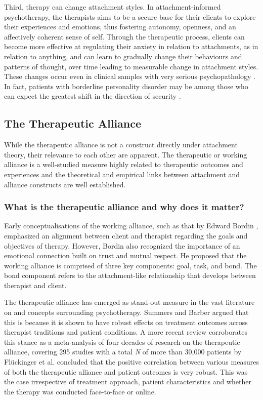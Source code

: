 \documentclass[12pt]{report}
\begin{document}
Third, therapy can change attachment styles. In attachment-informed psychotherapy, the therapists aims to be a secure base for their clients to explore their experiences and emotions, thus fostering autonomy, openness, and an affectively coherent sense of self.
Through the therapeutic process, clients can become more effective at regulating their anxiety in relation to attachments, as in relation to anything, and can learn to gradually change their behaviours and patterns of thought, over time leading to measurable change in attachment styles.
These changes occur even in clinical samples with very serious psychopathology \cite{Fonagy1996}.
In fact, patients with borderline personality disorder may be among those who can expect the greatest shift in the direction of security \cite{Levy2006, Stovall2003}.

\subsection{The Therapeutic Alliance}
While the therapeutic alliance is not a construct directly under attachment theory, their relevance to each other are apparent. The therapeutic or working alliance is a well-studied measure highly related to therapeutic outcomes and experiences and the theoretical and empirical links between attachment and alliance constructs are well established.

\subsubsection*{What is the therapeutic alliance and why does it matter?}
Early conceptualisations of the working alliance, such as that by Edward Bordin \citeyear{Bordin1979}, emphasized an alignment between client and therapist regarding the goals and objectives of therapy. However, Bordin also recognized the importance of an emotional connection built on trust and mutual respect. He proposed that the working alliance is comprised of three key components: goal, task, and bond. The bond component refers to the attachment-like relationship that develops between therapist and client.

The therapeutic alliance has emerged as stand-out measure in the vast literature on and concepts surrounding psychotherapy. Summers and Barber \citeyear{Summers2003} argued that this is because it is shown to have robust effects on treatment outcomes across therapist traditions and patient conditions.
A more recent review corroborates this stance as a meta-analysis of four decades of research on the therapeutic alliance, covering 295 studies with a total \textit{N} of more than 30,000 patients by Flückinger et al. \citeyear{Fluckinger2018} concluded that the positive correlation between various measures of both the therapeutic alliance and patient outcomes is very robust.
This was the case irrespective of treatment approach, patient characteristics and whether the therapy was conducted face-to-face or online.
\end{document}
